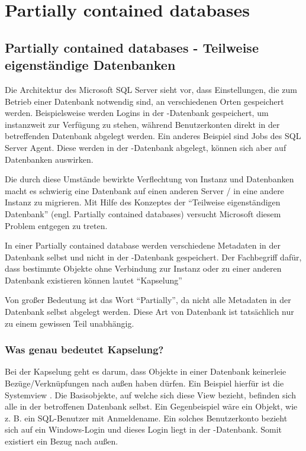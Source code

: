   \chapter{Partially contained databases}
    \setcounter{page}{1}
    \minitoc
\newpage
    \section{Partially contained databases - Teilweise eigenständige
    Datenbanken} 
      Die Architektur des Microsoft SQL Server sieht vor, dass Einstellungen,
      die zum Betrieb einer Datenbank notwendig sind, an verschiedenen Orten
      gespeichert werden. Beispielsweise werden Logins in der
      -Datenbank gespeichert, um instanzweit zur Verfügung zu
      stehen, während Benutzerkonten direkt in der betreffenden Datenbank
      abgelegt werden. Ein anderes Beispiel sind Jobs des SQL Server Agent.
      Diese werden in der -Datenbank abgelegt, können sich aber
      auf Datenbanken auswirken.
      
      Die durch diese Umstände bewirkte Verflechtung von Instanz und Datenbanken
      macht es schwierig eine Datenbank auf einen anderen Server / in eine
      andere Instanz zu migrieren. Mit Hilfe des Konzeptes der
      \enquote{Teilweise eigenständigen Datenbank} (engl. Partially contained
      databases) versucht Microsoft diesem Problem entgegen zu treten.

      In einer Partially contained database werden verschiedene Metadaten
      in der Datenbank selbst und nicht in der -Datenbank
      gespeichert. Der Fachbegriff dafür, dass bestimmte Objekte ohne
      Verbindung zur Instanz oder zu einer anderen Datenbank existieren können
      lautet \enquote{Kapselung}
      \begin{merke}
        Von großer Bedeutung ist das Wort \enquote{Partially}, da nicht alle
        Metadaten in der Datenbank selbst abgelegt werden. Diese Art von
        Datenbank ist tatsächlich nur zu einem gewissen Teil unabhängig.
      \end{merke}
      \subsection{Was genau bedeutet Kapselung?}
        Bei der Kapselung geht es darum, dass Objekte in einer Datenbank
        keinerleie Bezüge/Verknüpfungen nach außen haben dürfen. Ein Beispiel
        hierfür ist die Systemview . Die Basisobjekte,
        auf welche sich diese View bezieht, befinden sich alle in der
        betroffenen Datenbank selbst. Ein Gegenbeispiel wäre ein Objekt, wie
        z. B. ein SQL-Benutzer mit Anmeldename. Ein solches Benutzerkonto
        bezieht sich auf ein Windows-Login und dieses Login liegt in der
        -Datenbank. Somit existiert ein Bezug nach außen.
        
